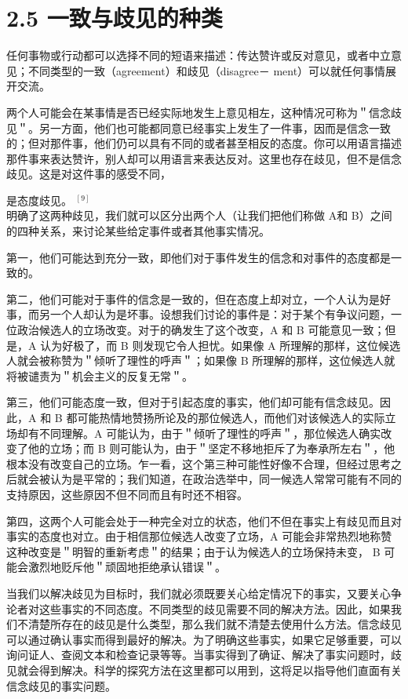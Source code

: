 \section*{2.5 一致与歧见的种类}
任何事物或行动都可以选择不同的短语来描述：传达赞许或反对意见，或者中立意见；不同类型的一致（agreement）和歧见（disagree－ ment）可以就任何事情展开交流。

两个人可能会在某事情是否已经实际地发生上意见相左，这种情况可称为＂信念歧见＂。另一方面，他们也可能都同意已经事实上发生了一件事，因而是信念一致的；但对那件事，他们仍可以具有不同的或者甚至相反的态度。你可以用语言描述那件事来表达赞许，别人却可以用语言来表达反对。这里也存在歧见，但不是信念歧见。这是对这件事的感受不同，

是态度歧见。 ${ }^{[9]}$\\
明确了这两种歧见，我们就可以区分出两个人（让我们把他们称做 A和 B）之间的四种关系，来讨论某些给定事件或者其他事实情况。

第一，他们可能达到充分一致，即他们对于事件发生的信念和对事件的态度都是一致的。

第二，他们可能对于事件的信念是一致的，但在态度上却对立，一个人认为是好事，而另一个人却认为是坏事。设想我们讨论的事件是：对于某个有争议问题，一位政治候选人的立场改变。对于的确发生了这个改变，A 和 B 可能意见一致；但是，A 认为好极了，而 B 则发现它令人担忧。如果像 A 所理解的那样，这位候选人就会被称赞为＂倾听了理性的呼声＂；如果像 B 所理解的那样，这位候选人就将被谴责为＂机会主义的反复无常＂。

第三，他们可能态度一致，但对于引起态度的事实，他们却可能有信念歧见。因此，A 和 B 都可能热情地赞扬所论及的那位候选人，而他们对该候选人的实际立场却有不同理解。A 可能认为，由于＂倾听了理性的呼声＂，那位候选人确实改变了他的立场；而 B 则可能认为，由于＂坚定不移地拒斥了为奉承所左右＂，他根本没有改变自己的立场。乍一看，这个第三种可能性好像不合理，但经过思考之后就会被认为是平常的；我们知道，在政治选举中，同一候选人常常可能有不同的支持原因，这些原因不但不同而且有时还不相容。

第四，这两个人可能会处于一种完全对立的状态，他们不但在事实上有歧见而且对事实的态度也对立。由于相信那位候选人改变了立场，A 可能会非常热烈地称赞这种改变是＂明智的重新考虑＂的结果；由于认为候选人的立场保持未变， B 可能会激烈地贬斥他＂顽固地拒绝承认错误＂。

当我们以解决歧见为目标时，我们就必须既要关心给定情况下的事实，又要关心争论者对这些事实的不同态度。不同类型的歧见需要不同的解决方法。因此，如果我们不清楚所存在的歧见是什么类型，那么我们就不清楚去使用什么方法。信念歧见可以通过确认事实而得到最好的解决。为了明确这些事实，如果它足够重要，可以询问证人、查阅文本和检查记录等等。当事实得到了确证、解决了事实问题时，歧见就会得到解决。科学的探究方法在这里都可以用到，这将足以指导他们直面有关信念歧见的事实问题。

